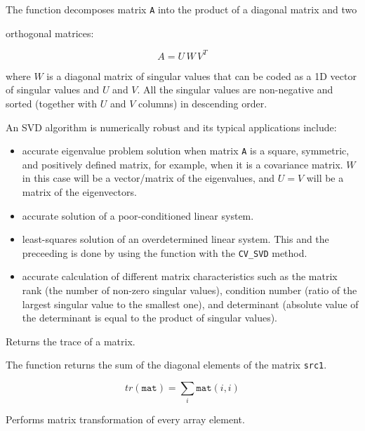 The function decomposes matrix \texttt{A} into the product of a diagonal matrix and two 

orthogonal matrices:

\[
A=U \, W \, V^T
\]

where $W$ is a diagonal matrix of singular values that can be coded as a
1D vector of singular values and $U$ and $V$. All the singular values
are non-negative and sorted (together with $U$ and $V$ columns)
in descending order.

An SVD algorithm is numerically robust and its typical applications include:

\begin{itemize}
  \item accurate eigenvalue problem solution when matrix \texttt{A}
  is a square, symmetric, and positively defined matrix, for example, when
  it is a covariance matrix. $W$ in this case will be a vector/matrix
  of the eigenvalues, and $U = V$ will be a matrix of the eigenvectors.
  \item accurate solution of a poor-conditioned linear system.
  \item least-squares solution of an overdetermined linear system. This and the preceeding is done by using the  function with the \texttt{CV\_SVD} method.
  \item accurate calculation of different matrix characteristics such as the matrix rank (the number of non-zero singular values), condition number (ratio of the largest singular value to the smallest one), and determinant (absolute value of the determinant is equal to the product of singular values). 
\end{itemize}

Returns the trace of a matrix.


\begin{description}
\end{description}


The function returns the sum of the diagonal elements of the matrix \texttt{src1}.

\[ tr(\texttt{mat}) = \sum_i \texttt{mat}(i,i) \]


Performs matrix transformation of every array element.


